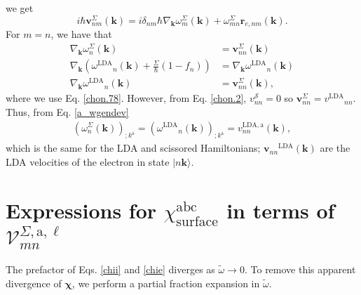 we get
\begin{equation}\label{a_hrt2}
i\hbar\mathbf{v}^{\Sigma}_{nm}(\mathbf{k})
= i\delta_{nm}\hbar\nabla_{\mathbf{k}}\omega^{\Sigma}_{m}(\mathbf{k})
  + \omega^{\Sigma}_{mn}\mathbf{r}_{e,nm}(\mathbf{k}).
\end{equation}
For $m = n$, we have that
\begin{align}\label{a_gradw}
\nabla_{\mathbf{k}}\omega^{\Sigma}_{n}(\mathbf{k})
    &= \mathbf{v}^{\Sigma}_{nn}(\mathbf{k})\nonumber\\
\nabla_{\mathbf{k}}(\omega{^\mathrm{LDA}}_{n}(\mathbf{k})
    + \frac{\Sigma}{\hbar}(1-f_{n}))
&= \nabla_{\mathbf{k}}\omega{^\mathrm{LDA}}_{n}(\mathbf{k})\nonumber\\
\nabla_{\mathbf{k}}\omega{^\mathrm{LDA}}_{n}(\mathbf{k})
    &= \mathbf{v}^{\Sigma}_{nn}(\mathbf{k}),
\end{align}
where we use Eq. \eqref{chon.78}. However, from Eq. \eqref{chon.2},
$v^{\mathcal{S}}_{nn} = 0$ so $\mathbf{v}^{\Sigma}_{nn}=v{^\mathrm{LDA}}_{nn}$.
Thus, from Eq. \eqref{a_wgendev}
\begin{align}\label{a_gradw2}
(\omega^{\Sigma}_{n}(\mathbf{k}))_{;k^{\mathrm{a}}}
= (\omega{^\mathrm{LDA}}_{n}(\mathbf{k}))_{;k^{\mathrm{a}}}
= v^{\mathrm{LDA},\mathrm{a}}_{nn}(\mathbf{k}),
\end{align}
which is the same for the LDA and scissored Hamiltonians;
$\mathbf{v}_{nn}{^\mathrm{LDA}}(\mathbf{k})$ are the LDA velocities of the
electron in state $\vert n\mathbf{k}\rangle$.



\section[Expressions for 
\texorpdfstring{$\chi_{\mathrm{surface}}^{\mathrm{abc}}$}{Xabc}]
{Expressions for 
\texorpdfstring{$\chi_{\mathrm{surface}}^{\mathrm{abc}}$}{Xabc} in terms of
\texorpdfstring{$\mathcal{V}^{\Sigma,\text{a},\ell}_{mn}$}{Vmn}}
\label{appv}

The prefactor of Eqs. \eqref{chii} and \eqref{chie} diverges as $\tilde\omega\to
0$. To remove this apparent divergence of $\boldsymbol{\chi}$, we perform a
partial fraction expansion in $\tilde\omega$.




